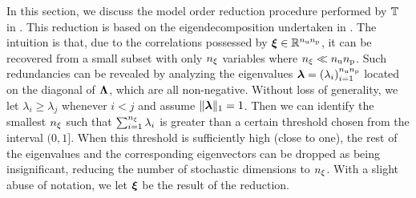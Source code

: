 In this section, we discuss the model order reduction procedure performed by $\transformation$ in .
This reduction is based on the eigendecomposition undertaken in .
The intuition is that, due to the correlations possessed by $\vz \in \real^{\nparams \nprocs}$, it can be recovered from a small subset with only $\nvars$ variables where $\nvars \ll \nparams \nprocs$.
Such redundancies can be revealed by analyzing the eigenvalues $\dimensionContribution = (\lambda_i)_{i = 1}^{\nparams \nprocs}$ located on the diagonal of $\mEDL$, which are all non-negative.
Without loss of generality, we let $\lambda_i \geq \lambda_j$ whenever $i < j$ and assume $\norm[1]{\dimensionContribution} = 1$.
Then we can identify the smallest $\nvars$ such that $\sum_{i = 1}^\nvars \lambda_i$ is greater than a certain threshold chosen from the interval $(0, 1]$.
When this threshold is sufficiently high (close to one), the rest of the eigenvalues and the corresponding eigenvectors can be dropped as being insignificant, reducing the number of stochastic dimensions to $\nvars$.
With a slight abuse of notation, we let $\vz$ be the result of the reduction.
